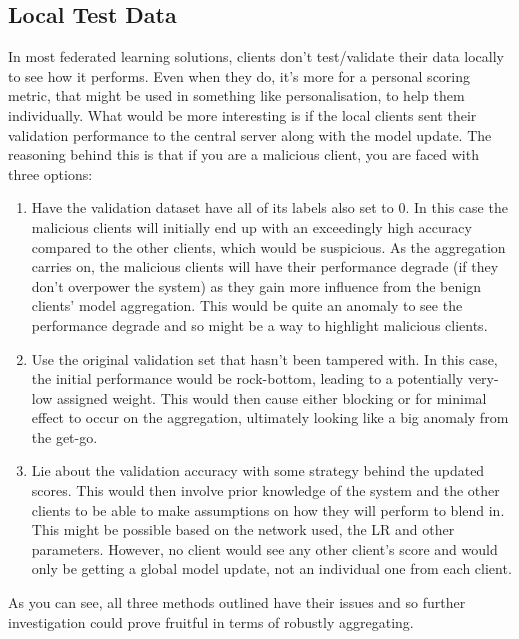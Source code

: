 \subsection{Local Test Data}
In most federated learning solutions, clients don't test/validate their data locally to see how it performs.
Even when they do, it's more for a personal scoring metric, that might be used in something like personalisation, to help them individually.
What would be more interesting is if the local clients sent their validation performance to the central server along with the model update.
The reasoning behind this is that if you are a malicious client, you are faced with three options:
\begin{enumerate}
    \item Have the validation dataset have all of its labels also set to 0.
    In this case the malicious clients will initially end up with an exceedingly high accuracy compared to the other clients, which would be suspicious.
    As the aggregation carries on, the malicious clients will have their performance degrade (if they don't overpower the system) as they gain more influence from the benign clients' model aggregation.
    This would be quite an anomaly to see the performance degrade and so might be a way to highlight malicious clients.
    
    \item Use the original validation set that hasn't been tampered with.
    In this case, the initial performance would be rock-bottom, leading to a potentially very-low assigned weight.
    This would then cause either blocking or for minimal effect to occur on the aggregation, ultimately looking like a big anomaly from the get-go.
    
    \item Lie about the validation accuracy with some strategy behind the updated scores.
    This would then involve prior knowledge of the system and the other clients to be able to make assumptions on how they will perform to blend in.
    This might be possible based on the network used, the LR and other parameters.
    However, no client would see any other client's score and would only be getting a global model update, not an individual one from each client.
\end{enumerate}

As you can see, all three methods outlined have their issues and so further investigation could prove fruitful in terms of robustly aggregating.


